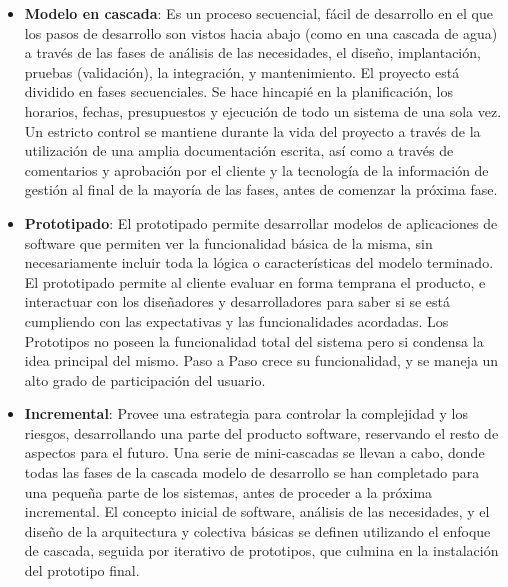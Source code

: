 \documentclass[12pt, a4paper]{report}
\begin{document}
            \begin{itemize}
				\item \textbf{Modelo en cascada}: Es un proceso secuencial, fácil de desarrollo en el que los pasos de desarrollo son vistos hacia abajo (como en una cascada de agua) a través de las fases de análisis de las necesidades, el diseño, implantación, pruebas (validación), la integración, y mantenimiento. El proyecto está dividido en fases secuenciales. Se hace hincapié en la planificación, los horarios, fechas, presupuestos y ejecución de todo un sistema de una sola vez. Un estricto control se mantiene durante la vida del proyecto a través de la utilización de una amplia documentación escrita, así como a través de comentarios y aprobación por el cliente y la tecnología de la información de gestión al final de la mayoría de las fases, antes de comenzar la próxima fase. \cite{wikipedia:metodologias}

				\item \textbf{Prototipado}: El prototipado permite desarrollar modelos de aplicaciones de software que permiten ver la funcionalidad básica de la misma, sin necesariamente incluir toda la lógica o características del modelo terminado. El prototipado permite al cliente evaluar en forma temprana el producto, e interactuar con los diseñadores y desarrolladores para saber si se está cumpliendo con las expectativas y las funcionalidades acordadas. Los Prototipos no poseen la funcionalidad total del sistema pero si condensa la idea principal del mismo. Paso a Paso crece su funcionalidad, y se maneja un alto grado de participación del usuario. \cite{wikipedia:metodologias}

				\item \textbf{Incremental}: Provee una estrategia para controlar la complejidad y los riesgos, desarrollando una parte del producto software, reservando el resto de aspectos para el futuro. Una serie de mini-cascadas se llevan a cabo, donde todas las fases de la cascada modelo de desarrollo se han completado para una pequeña parte de los sistemas, antes de proceder a la próxima incremental. El concepto inicial de software, análisis de las necesidades, y el diseño de la arquitectura y colectiva básicas se definen utilizando el enfoque de cascada, seguida por iterativo de prototipos, que culmina en la instalación del prototipo final. \cite{wikipedia:metodologias}


\end{itemize}
\end{document}
